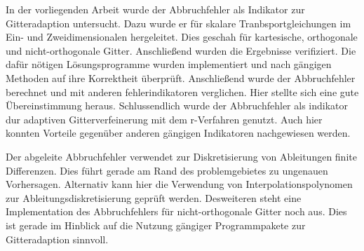 In der vorliegenden Arbeit wurde der Abbruchfehler als Indikator zur
Gitteradaption untersucht. Dazu wurde er für skalare Tranbsportgleichungen 
im Ein- und Zweidimensionalen hergeleitet. Dies geschah für kartesische,
orthogonale und nicht-orthogonale Gitter.
Anschließend wurden die Ergebnisse verifiziert. Die dafür nötigen Lösungsprogramme
wurden implementiert und nach gängigen Methoden auf ihre Korrektheit überprüft.
Anschließend wurde der Abbruchfehler berechnet und mit anderen fehlerindikatoren verglichen.
Hier stellte sich eine gute Übereinstimmung heraus. Schlussendlich
wurde der Abbruchfehler als indikator dur adaptiven Gitterverfeinerung mit dem r-Verfahren genutzt.
Auch hier konnten Vorteile gegenüber anderen gängigen Indikatoren nachgewiesen werden.

Der abgeleite Abbruchfehler verwendet zur Diskretisierung von Ableitungen
finite Differenzen. Dies führt gerade am Rand des problemgebietes zu ungenauen Vorhersagen.
Alternativ kann hier die Verwendung von Interpolationspolynomen 
zur Ableitungsdiskretisierung geprüft werden.
Desweiteren steht eine Implementation des Abbruchfehlers für nicht-orthogonale Gitter
noch aus. Dies ist gerade im Hinblick auf die Nutzung gängiger Programmpakete zur Gitteradaption
sinnvoll.
